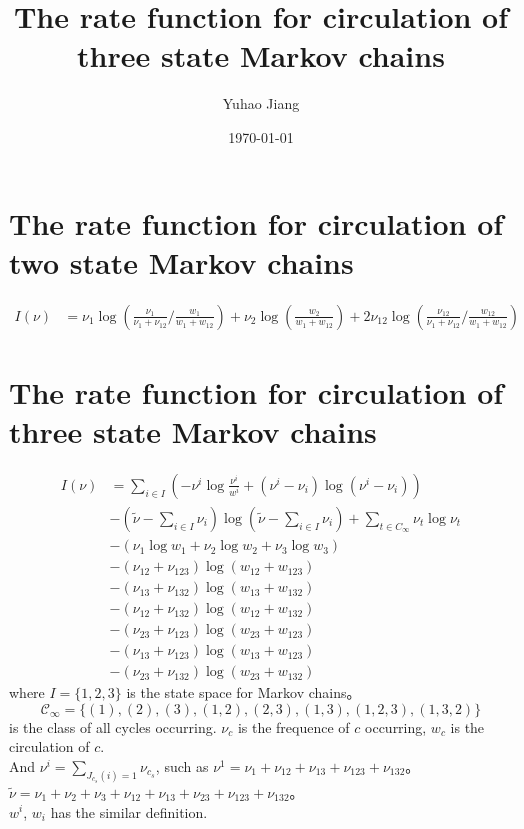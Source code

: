 \documentclass[11pt,en,cite=authoryear]{elegantpaper}
\title{The rate function for circulation of three state Markov chains}
\author{Yuhao Jiang}
\date{\today}
\begin{document}
\maketitle

\section{The rate function for circulation of two state Markov chains}
\begin{align*}
    I(\nu) &= \nu_{1}\log(\frac{\nu_{1}}{\nu_{1}+\nu_{12}}/\frac{w_{1}}{w_{1}+w_{12}}) + \nu_{2}\log(\frac{w_{2}}{w_{1}+w_{12}}) + 2\nu_{12} \log (\frac{\nu_{12}}{\nu_{1}+\nu_{12}}/\frac{w_{12}}{w_{1}+w_{12}})
\end{align*}

\section{The rate function for circulation of three state Markov chains}
\begin{align*}
    I(\nu) 
    &= \sum_{i \in I} \left(-\nu^{i} \log \frac{\nu^{i}}{w^{i}} + (\nu^{i} - \nu_{i}) \log(\nu^{i} - \nu_{i})\right) \\
    &-(\tilde{\nu} - \sum_{i \in I} \nu_i) \log (\tilde{\nu} - \sum_{i \in I} \nu_i)
    +\sum_{t \in C_{\infty}} \nu_t \log \nu_t \\
    &- (\nu_{1} \log w_{1} + \nu_{2} \log w_{2} + \nu_{3} \log w_{3})\\
    &- (\nu_{12} + \nu_{123}) \log(w_{12} + w_{123}) \\
    &- (\nu_{13} + \nu_{132}) \log(w_{13} + w_{132}) \\
    &- (\nu_{12} + \nu_{132}) \log(w_{12} + w_{132}) \\
    &- (\nu_{23} + \nu_{123}) \log(w_{23} + w_{123}) \\
    &- (\nu_{13} + \nu_{123}) \log(w_{13} + w_{123}) \\
    &- (\nu_{23} + \nu_{132}) \log(w_{23} + w_{132}) 
\end{align*}
where $I=\{1, 2, 3\}$ is the state space for Markov chains。
$$\mathcal{C}_{\infty} = \{(1), (2), (3), (1,2), (2,3), (1,3), (1,2,3), (1,3,2)\}$$
is the class of all cycles occurring.
$\nu_c$ is the frequence of $c$ occurring, $w_c$ is the circulation of $c$.\\
And $\nu^{i} = \sum_{J_{c_s}(i)=1} \nu_{c_s}$, such as $\nu^{1} = \nu_{1} + \nu_{12} + \nu_{13} + \nu_{123} +\nu_{132}$。
$\tilde{\nu} = \nu_{1} + \nu_{2} + \nu_{3} + \nu_{12} + \nu_{13} + \nu_{23} + \nu_{123} +\nu_{132}$。\\
$w^i$, $w_i$ has the similar definition.
\end{document}
